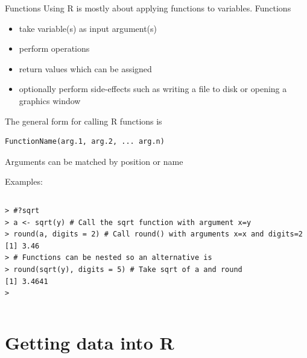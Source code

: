 \documentclass[table,smaller]{beamer}
\begin{document}
\begin{frame}[fragile,label=sec-3-2]{Functions}
 Using R is mostly about applying \alert{functions} to \alert{variables}. Functions
\begin{itemize}
\item take \alert{variable(s)} as input \alert{argument(s)}
\item perform operations
\item \alert{return} values which can be \alert{assigned}
\item optionally perform side-effects such as writing a file to disk or opening a graphics window
\end{itemize}

The general form for calling R functions is 
\begin{verbatim}
FunctionName(arg.1, arg.2, ... arg.n)
\end{verbatim}

Arguments can be matched by position or name

Examples:
\vspace{-.5em}
\begin{columns}
\begin{block}{}
\begin{verbatim}
> #?sqrt
> a <- sqrt(y) # Call the sqrt function with argument x=y
> round(a, digits = 2) # Call round() with arguments x=x and digits=2
[1] 3.46
> # Functions can be nested so an alternative is
> round(sqrt(y), digits = 5) # Take sqrt of a and round
[1] 3.4641
>
\end{verbatim}
\end{block}
\end{columns}
\vspace{.5em}
\end{frame}

\section{Getting data into R}
\label{sec-4}
\end{document}
